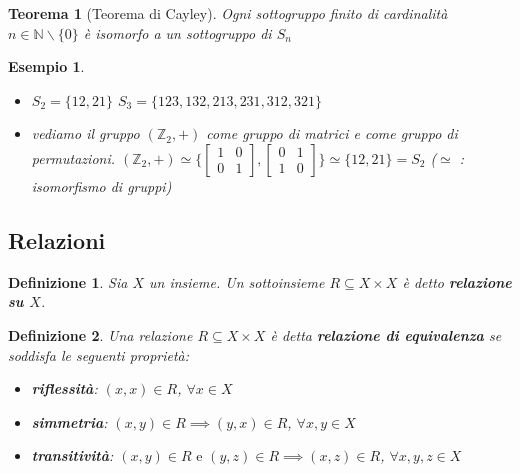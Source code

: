\documentclass[a4paper,12pt]{article}
\theoremstyle{def}
\newtheorem*{definition}{Definizione}
\theoremstyle{prop}
\theoremstyle{esempio}
\newtheorem*{example}{Esempio}
\theoremstyle{dimostrazione}
\theoremstyle{teo}
\newtheorem*{teorema}{Teorema}
\theoremstyle{osservazione}
\begin{document}
\begin{teorema}[Teorema di Cayley]
    Ogni sottogruppo finito di cardinalità \(n \in \mathbb{N} \backslash \{0\}\) è isomorfo a un sottogruppo di \(S_n\)
\end{teorema}

\begin{example}
    \
    \begin{itemize}
        \item \(S_2 = \{12,21\}\)\newline
              \(S_3 = \{123,132,213,231,312,321\}\)\newline

        \item vediamo il gruppo \((\mathbb{Z}_2,+)\) come gruppo di matrici e come gruppo di permutazioni. \((\mathbb{Z}_2, +) \simeq \{\begin{bmatrix}
                  1 & 0 \\
                  0 & 1
              \end{bmatrix}, \begin{bmatrix}
                  0 & 1 \\
                  1 & 0
              \end{bmatrix}\} \simeq \{12,21\} = S_2\) (\(\simeq\) : isomorfismo di gruppi)
    \end{itemize}
\end{example}

\subsection{Relazioni}

\begin{definition}
    Sia \(X\) un insieme. Un sottoinsieme \(R \subseteq X \times X\) è detto \textbf{relazione su \(X\)}.
\end{definition}

\begin{definition}
    Una relazione \(R \subseteq X \times X\) è detta \textbf{relazione di equivalenza} se soddisfa le seguenti proprietà: \
    \begin{itemize}
        \item \textbf{riflessità}: \((x,x) \in R\), \(\forall x \in X\)
        \item \textbf{simmetria}: \((x,y) \in R \implies (y,x) \in R\), \(\forall x,y \in X\)
        \item \textbf{transitività}: \((x,y) \in R \text{ e } (y,z) \in R \implies (x,z) \in R\), \(\forall x,y,z \in X\)
    \end{itemize}
\end{definition}
\end{document}
